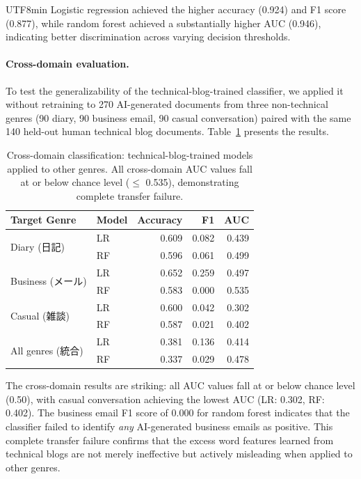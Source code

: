 \documentclass[11pt,a4paper]{article}
\begin{document}
\begin{CJK}{UTF8}{min}
Logistic regression achieved the higher accuracy (0.924) and F1 score (0.877), while random forest achieved a substantially higher AUC (0.946), indicating better discrimination across varying decision thresholds.

\paragraph{Cross-domain evaluation.}
To test the generalizability of the technical-blog-trained classifier, we applied it without retraining to 270 AI-generated documents from three non-technical genres (90 diary, 90 business email, 90 casual conversation) paired with the same 140 held-out human technical blog documents. Table~\ref{tab:cross_domain} presents the results.

\begin{table}[H]
\centering
\caption{Cross-domain classification: technical-blog-trained models applied to other genres. All cross-domain AUC values fall at or below chance level ($\leq$ 0.535), demonstrating complete transfer failure.}
\label{tab:cross_domain}
\small
\begin{tabular}{llrrr}
\toprule
Target Genre & Model & Accuracy & F1 & AUC \\
\midrule
\multirow{2}{*}{Diary (日記)} & LR & 0.609 & 0.082 & 0.439 \\
                               & RF & 0.596 & 0.061 & 0.499 \\
\midrule
\multirow{2}{*}{Business (メール)} & LR & 0.652 & 0.259 & 0.497 \\
                                    & RF & 0.583 & 0.000 & 0.535 \\
\midrule
\multirow{2}{*}{Casual (雑談)} & LR & 0.600 & 0.042 & 0.302 \\
                                & RF & 0.587 & 0.021 & 0.402 \\
\midrule
\multirow{2}{*}{All genres (統合)} & LR & 0.381 & 0.136 & 0.414 \\
                                    & RF & 0.337 & 0.029 & 0.478 \\
\bottomrule
\end{tabular}
\end{table}

The cross-domain results are striking: all AUC values fall at or below chance level (0.50), with casual conversation achieving the lowest AUC (LR: 0.302, RF: 0.402). The business email F1 score of 0.000 for random forest indicates that the classifier failed to identify \emph{any} AI-generated business emails as positive. This complete transfer failure confirms that the excess word features learned from technical blogs are not merely ineffective but actively misleading when applied to other genres.


\end{CJK}
\end{document}
